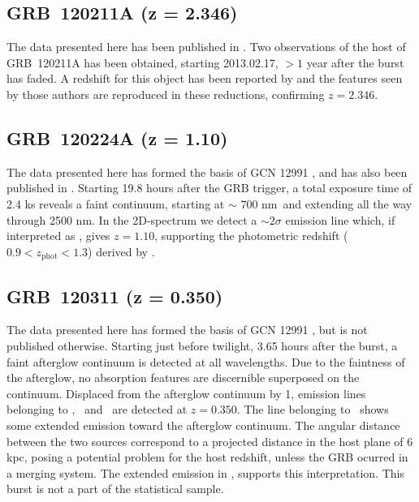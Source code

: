 \documentclass{aa}    %
\begin{document}
\subsection{GRB~120211A (z = 2.346)} \label{120211}

The data presented here has been published in \citet{Kruhler2015}. Two
observations of the host of GRB~120211A has been obtained, starting 2013.02.17,
$> 1$ year after the burst has faded. A redshift for this object has been
reported by \citet{Kruhler2015} and the features seen by those authors are
reproduced in these reductions, confirming $z =	2.346$.

\subsection{GRB~120224A (z = 1.10)} \label{120224}

The data presented here has formed the basis of GCN 12991 \citep{GCN12991}, and
has also been published in \citet{Kruhler2015}. Starting 19.8 hours after the
GRB trigger, a total exposure time of 2.4 ks reveals a faint continuum, starting
at $\sim$ 700 nm~and extending all the way through 2500 nm. In the 2D-spectrum
we detect a $\sim 2 \sigma$ emission line which, if interpreted as \ha, gives $z
= 1.10$, supporting the photometric redshift ($0.9 < z_\mathrm{phot} < 1.3$)
derived by \citet{Kruhler2015}.

\subsection{GRB~120311 (z = 0.350)} \label{120311}

The data presented here has formed the basis of GCN 12991 \citep{GCN12991}, but
is not published otherwise. Starting just before twilight, 3.65 hours after the
burst, a faint afterglow continuum is detected at all wavelengths. Due to the
faintness of the afterglow, no absorption features are discernible superposed on
the continuum. Displaced from the afterglow continuum by 1, emission lines
belonging to \hb, \oiii~and \ha~are detected at $z = 0.350$. The line belonging
to \ha~shows some extended emission toward the afterglow continuum. The angular
distance between the two sources correspond to a projected distance in the host
plane of 6 kpc, posing a potential problem for the host redshift, unless the GRB
ocurred in a merging system. The extended emission in \ha, supports this
interpretation. This burst is not a part of the statistical sample.
\end{document}
